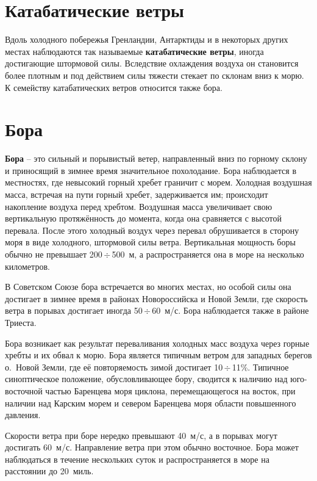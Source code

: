 \documentclass[a4paper, 12pt, twoside, final, book, russian, fittopage, cyremdash, openright]{ncc}
\newcommand{\mps}{~м/с\xspace}
\newcommand{\otdo}{\,\ensuremath{\div}\,}
\begin{document}
\section{Катабатические ветры}
\label{sec:catabatic_wind}

Вдоль холодного побережья Гренландии, Антарктиды и в некоторых других
местах наблюдаются так называемые \textbf{катабатические
  ветры}, иногда достигающие штормовой
силы. Вследствие охлаждения воздуха он становится более плотным и под
действием силы тяжести стекает по склонам вниз к морю. К семейству
катабатических ветров относится также бора.

\section{Бора}
\label{sec:bora_wind}

\textbf{Бора} \--- это сильный и порывистый ветер, направленный вниз
по горному склону и приносящий в зимнее время значительное
похолодание. Бора наблюдается в местностях, где невысокий горный
хребет граничит с морем. Холодная воздушная масса, встречая на пути
горный хребет, задерживается им; происходит накопление воздуха перед
хребтом. Воздушная масса увеличивает свою вертикальную протяжённость
до момента, когда она сравняется с высотой перевала. После этого
холодный воздух через перевал обрушивается в сторону моря в виде
холодного, штормовой силы ветра. Вертикальная мощность боры обычно не
превышает 200\otdo{}500~м, а распространяется она в море на несколько
километров.

В Советском Союзе бора встречается во многих местах, но особой силы
она достигает в зимнее время в районах Новороссийска и Новой Земли,
где скорость ветра в порывах достигает иногда 50\otdo{}60\mps. Бора
наблюдается также в районе Триеста.

Бора возникает как результат переваливания холодных масс воздуха через
горные хребты и их обвал к морю. Бора является типичным ветром для
западных берегов о.~Новой Земли, где её повторяемость зимой достигает
10\otdo{}11\%. Типичное синоптическое положение, обусловливающее бору,
сводится к наличию над юго-восточной частью Баренцева моря циклона,
перемещающегося на восток, при наличии над Карским морем и севером
Баренцева моря области повышенного давления.

Скорости ветра при боре нередко превышают 40\mps{}, а в порывах могут
достигать 60\mps{}.  Направление ветра при этом обычно восточное. Бора
может наблюдаться в течение нескольких суток и распространяется в море
на расстоянии до 20~миль.
\end{document}
